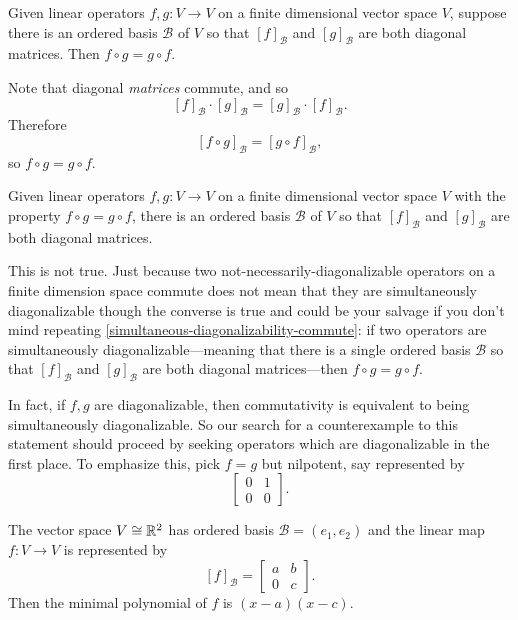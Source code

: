 \documentclass{homework}
\begin{document}
\begin{problem}\label{simultaneous-diagonalizability-commute}Given
  linear operators $f, g : V \to V$ on a finite dimensional vector
  space $V$, suppose there is an ordered basis $\mathcal{B}$ of $V$ so
  that $[f]_{\mathcal{B}}$ and $[g]_{\mathcal{B}}$ are both diagonal
  matrices.  Then $f \circ g = g \circ f$.
\end{problem}

\begin{solution}
  Note that diagonal \textit{matrices} commute, and so
  \[
    [f]_{\mathcal{B}} \cdot [g]_{\mathcal{B}} = [g]_{\mathcal{B}} \cdot [f]_{\mathcal{B}}.
  \]
  Therefore
  \[
    [f \circ g]_{\mathcal{B}} = [g \circ f]_{\mathcal{B}},
  \]
  so $f \circ g = g \circ f$.
\end{solution}

\begin{problem}
  Given linear operators $f, g : V \to V$ on a finite dimensional
  vector space $V$ with the property $f \circ g = g \circ f$, there is
  an ordered basis $\mathcal{B}$ of $V$ so that $[f]_{\mathcal{B}}$
  and $[g]_{\mathcal{B}}$ are both diagonal matrices.
\end{problem}

\begin{solution}
  This is not true.  Just because two not-necessarily-diagonalizable
  operators on a finite dimension space commute does not mean that
  they are simultaneously diagonalizable though the converse is true
  and could be your salvage if you don't mind repeating
  \ref{simultaneous-diagonalizability-commute}: if two operators are
  simultaneously diagonalizable---meaning that there is a single
  ordered basis $\mathcal{B}$ so that $[f]_{\mathcal{B}}$ and
  $[g]_{\mathcal{B}}$ are both diagonal matrices---then
  $f \circ g = g \circ f$.

  In fact, if $f, g$ are diagonalizable, then commutativity is
  equivalent to being simultaneously diagonalizable.  So our search
  for a counterexample to this statement should proceed by seeking
  operators which are diagonalizable in the first place.  To emphasize this, pick $f = g$ but nilpotent, say represented by
  \[
    \begin{bmatrix}
      0 & 1 \\
      0 & 0
    \end{bmatrix}.
  \]
\end{solution}

\begin{problem}
  The vector space $V \cong \mathbb{R}^2$ has ordered basis $\mathcal{B} = (e_1,e_2)$ and the linear map $f : V \to V$ is represented by
  \[
    [f]_{\mathcal{B}} = \begin{bmatrix} a & b \\ 0 & c \end{bmatrix}.
  \]
  Then the minimal polynomial of $f$ is $(x-a)(x-c)$.
\end{problem}
\end{document}
